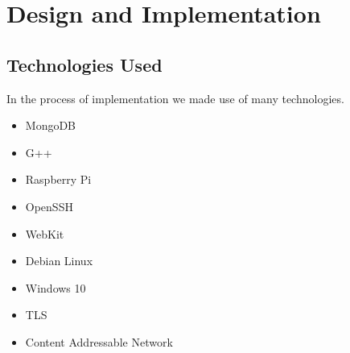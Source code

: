 \section{Design and Implementation}
\subsection{Technologies Used}
In the process of implementation we made use of many technologies.
\begin{itemize}
	\item MongoDB
	\item G++
	\item Raspberry Pi
	\item OpenSSH
	\item WebKit
	\item Debian Linux
	\item Windows 10
	\item TLS
	\item Content Addressable Network
\end{itemize}
